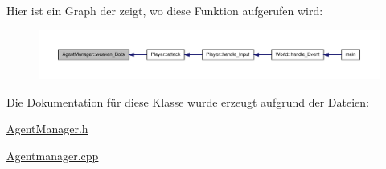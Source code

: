 Hier ist ein Graph der zeigt, wo diese Funktion aufgerufen wird\-:
\nopagebreak
\begin{figure}[H]
\begin{center}
\leavevmode
\includegraphics[width=350pt]{class_agent_manager_aafa2ae19bfa65b44dc3c955bd21e0fc3_icgraph}
\end{center}
\end{figure}




Die Dokumentation für diese Klasse wurde erzeugt aufgrund der Dateien\-:\begin{DoxyCompactItemize}
\item 
\hyperlink{_agent_manager_8h}{Agent\-Manager.\-h}\item 
\hyperlink{_agentmanager_8cpp}{Agentmanager.\-cpp}\end{DoxyCompactItemize}
